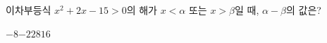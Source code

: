 \hspace*{2mm}\begin{minipage}[t]{\dimexpr\linewidth-2mm\relax}\vspace{0pt}
이차부등식 $x^2+2x-15>0$의 해가 $x<\alpha$ 또는 $x>\beta$일 때, $\alpha-\beta$의 값은?
\begin{choices32}{$-8$}{$-2$}{$2$}{$8$}{$16$}\end{choices32}\end{minipage}
